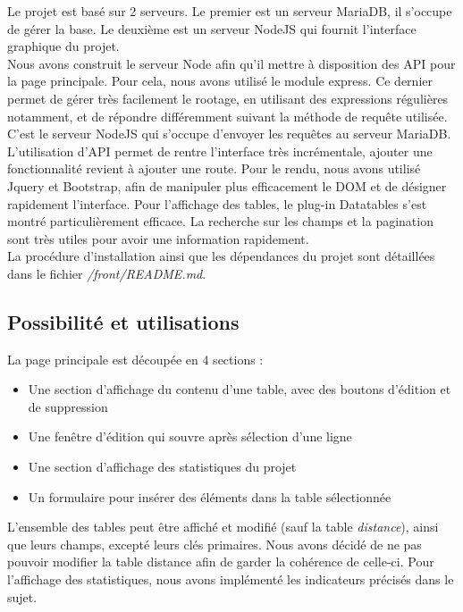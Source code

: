 \documentclass[10pt]{article}
\begin{document}
  Le projet est basé sur 2 serveurs. Le premier est un serveur MariaDB, il s'occupe de gérer la base. Le deuxième est un serveur NodeJS qui fournit l'interface graphique du projet. \\
 
  Nous avons construit le serveur Node afin qu'il mettre à disposition des API pour la page principale. Pour cela, nous avons utilisé le module express. Ce dernier permet de gérer très facilement le rootage, en utilisant des expressions régulières notamment, et de répondre différemment suivant la méthode de requête utilisée. C'est le serveur NodeJS qui s'occupe d'envoyer les requêtes au serveur MariaDB. L'utilisation d'API permet de rentre l'interface très incrémentale, ajouter une fonctionnalité revient à ajouter une route.
  Pour le rendu, nous avons utilisé Jquery et Bootstrap, afin de manipuler plus efficacement le DOM et de désigner rapidement l'interface. Pour l'affichage des tables, le plug-in Datatables s'est montré particulièrement efficace. La recherche sur les champs et la pagination sont très utiles pour avoir une information rapidement. \\
  
  La procédure d'installation ainsi que les dépendances du projet sont détaillées dans le fichier \mbox{\textit{/front/README.md}}.
  
  \subsection{Possibilité et utilisations}\label{subsec:possib}
  
La page principale est découpée en 4 sections :
  \begin{itemize}
  \item Une section d'affichage du contenu d'une table, avec des boutons d'édition et de suppression
  \item Une fenêtre d'édition qui souvre après sélection d'une ligne
  \item Une section d'affichage des statistiques du projet
  \item Un formulaire pour insérer des éléments dans la table sélectionnée \\
\end{itemize}

L'ensemble des tables peut être affiché et modifié (sauf la table \textit{distance}), ainsi que leurs champs, excepté leurs clés primaires. Nous avons décidé de ne pas pouvoir modifier la table distance afin de garder la cohérence de celle-ci. Pour l'affichage des statistiques, nous avons implémenté les indicateurs précisés dans le sujet.
\end{document}
